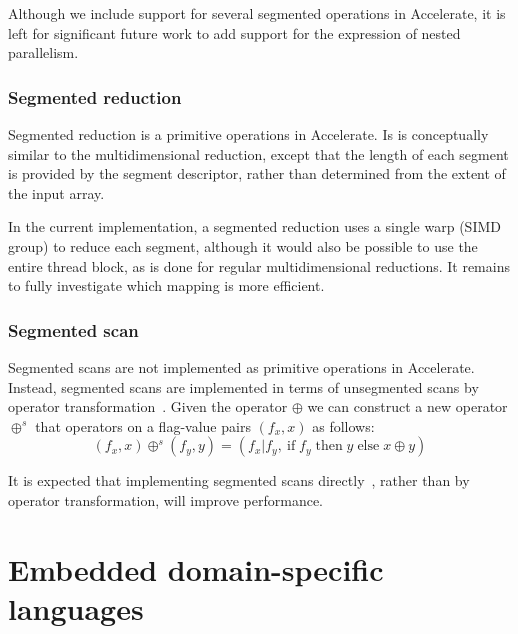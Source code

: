 Although we include support for several segmented operations in Accelerate, it
is left for significant future work to add support for the expression of nested
parallelism.


\subsubsection{Segmented reduction}

Segmented reduction is a primitive operations in Accelerate. Is is conceptually
similar to the multidimensional reduction, except that the length of each
segment is provided by the segment descriptor, rather than determined from the
extent of the input array.

In the current implementation, a segmented reduction uses a single
warp\cuda[warp]{} (SIMD group) to reduce each segment, although it would also be
possible to use the entire thread block, as is done for regular multidimensional
reductions. It remains to fully investigate which mapping is more efficient.


\subsubsection{Segmented scan}

Segmented scans are not implemented as primitive operations in Accelerate.
Instead, segmented scans are implemented in terms of unsegmented scans by
operator transformation~\cite{Schwartz:1980cy,Blelloch:1990ts}. Given the
operator $\oplus$ we can construct a new operator $\oplus^s$ that operators on a
flag-value pairs $\left( f_x, x \right)$ as follows:
%
\begin{equation*}
    \left( f_x, x \right) \oplus^s \left( f_y, y \right)
        = \left( f_x | f_y,\:\mathrm{if}\;f_y\;\mathrm{then}\;y\;\mathrm{else}\;x\oplus y \right)
\end{equation*}

It is expected that implementing segmented scans
directly~\cite{Sengupta:2008ut,Dotsenko:2008fo}, rather than by operator
transformation, will improve performance.

\cuda[|)]{}
\gpu[|)]{}


\section{Embedded domain-specific languages}
\label{sec:EDSLs}

